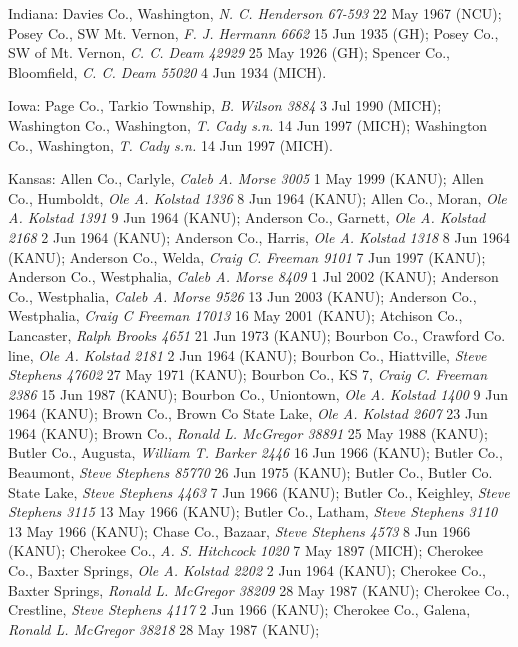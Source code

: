 \documentclass{article}
\begin{document}
Indiana:
Davies Co., Washington, \textit{N. C. Henderson 67-593} 22 May 1967 (NCU); 
Posey Co., SW Mt. Vernon, \textit{F. J. Hermann 6662} 15 Jun 1935 (GH); 
Posey Co., SW of Mt. Vernon, \textit{C. C. Deam 42929} 25 May 1926 (GH); 
Spencer Co., Bloomfield, \textit{C. C. Deam 55020} 4 Jun 1934 (MICH). 

Iowa:
Page Co., Tarkio Township, \textit{B. Wilson 3884} 3 Jul 1990 (MICH); 
Washington Co., Washington, \textit{T. Cady s.n.} 14 Jun 1997 (MICH); 
Washington Co., Washington, \textit{T. Cady s.n.} 14 Jun 1997 (MICH). 

Kansas:
Allen Co., Carlyle, \textit{Caleb A. Morse 3005} 1 May 1999 (KANU); 
Allen Co., Humboldt, \textit{Ole A. Kolstad 1336} 8 Jun 1964 (KANU); 
Allen Co., Moran, \textit{Ole A. Kolstad 1391} 9 Jun 1964 (KANU); 
Anderson Co., Garnett, \textit{Ole A. Kolstad 2168} 2 Jun 1964 (KANU); 
Anderson Co., Harris, \textit{Ole A. Kolstad 1318} 8 Jun 1964 (KANU); 
Anderson Co., Welda, \textit{Craig C. Freeman 9101} 7 Jun 1997 (KANU); 
Anderson Co., Westphalia, \textit{Caleb A. Morse 8409} 1 Jul 2002 (KANU); 
Anderson Co., Westphalia, \textit{Caleb A. Morse 9526} 13 Jun 2003 (KANU); 
Anderson Co., Westphalia, \textit{Craig C Freeman 17013} 16 May 2001 (KANU); 
Atchison Co., Lancaster, \textit{Ralph Brooks 4651} 21 Jun 1973 (KANU); 
Bourbon Co., Crawford Co. line, \textit{Ole A. Kolstad 2181} 2 Jun 1964 (KANU); 
Bourbon Co., Hiattville, \textit{Steve Stephens 47602} 27 May 1971 (KANU); 
Bourbon Co., KS 7, \textit{Craig C. Freeman 2386} 15 Jun 1987 (KANU); 
Bourbon Co., Uniontown, \textit{Ole A. Kolstad 1400} 9 Jun 1964 (KANU); 
Brown Co., Brown Co State Lake, \textit{Ole A. Kolstad 2607} 23 Jun 1964 (KANU); 
Brown Co., \textit{Ronald L. McGregor 38891} 25 May 1988 (KANU); 
Butler Co., Augusta, \textit{William T. Barker 2446} 16 Jun 1966 (KANU); 
Butler Co., Beaumont, \textit{Steve Stephens 85770} 26 Jun 1975 (KANU); 
Butler Co., Butler Co. State Lake, \textit{Steve Stephens 4463} 7 Jun 1966 (KANU); 
Butler Co., Keighley, \textit{Steve Stephens 3115} 13 May 1966 (KANU); 
Butler Co., Latham, \textit{Steve Stephens 3110} 13 May 1966 (KANU); 
Chase Co., Bazaar, \textit{Steve Stephens 4573} 8 Jun 1966 (KANU); 
Cherokee Co., \textit{A. S. Hitchcock 1020} 7 May 1897 (MICH); 
Cherokee Co., Baxter Springs, \textit{Ole A. Kolstad 2202} 2 Jun 1964 (KANU); 
Cherokee Co., Baxter Springs, \textit{Ronald L. McGregor 38209} 28 May 1987 (KANU); 
Cherokee Co., Crestline, \textit{Steve Stephens 4117} 2 Jun 1966 (KANU); 
Cherokee Co., Galena, \textit{Ronald L. McGregor 38218} 28 May 1987 (KANU); 
\end{document}
